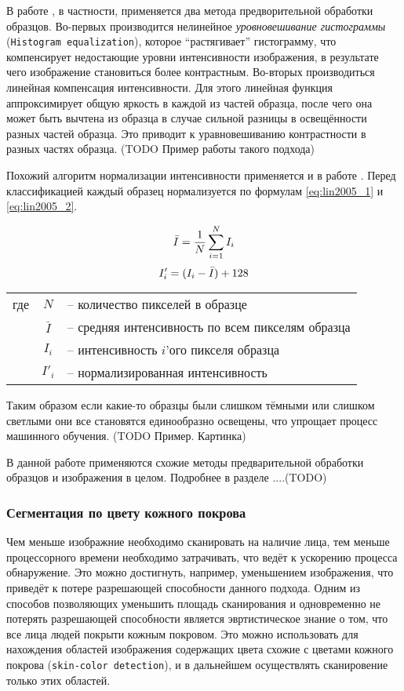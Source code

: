 \documentclass[12pt]{report}
\begin{document}
В работе \citep{rowley1998neural}, в частности, применяется два метода предворительной обработки образцов. Во-первых производится нелинейное \emph{уровновешивание гистограммы} (\texttt{Histogram equalization}), которое ``растягивает'' гистограмму, что компенсирует недостающие уровни интенсивности изображения, в результате чего изображение становиться более контрастным. Во-вторых производиться линейная компенсация интенсивности. Для этого линейная функция аппроксимирует общую яркость в каждой из частей образца, после чего она может быть вычтена из образца в случае сильной разницы в освещённости разных частей образца. Это приводит к уравновешиванию контрастности в разных частях образца. (TODO Пример работы такого подхода) 

Похожий алгоритм нормализации интенсивности применяется и в работе \citep{lin2005face}. Перед классификацией каждый образец нормализуется по формулам \ref{eq:lin2005_1} и \ref{eq:lin2005_2}.

\begin{equation}
\label{eq:lin2005_1}
\centering
\bar{I}=\frac{1}{N}\sum_{i=1}^{N}I_{i}
\end{equation}
\begin{equation}
\label{eq:lin2005_2}
\centering
{I}'_i=(I_i-\bar{I})+128
\end{equation}

\begin{tabular}{p{3cm} c l}
где & $N$ & -- количество пикселей в образце\\
	& $\bar{I}$ & -- средняя интенсивность по всем пикселям образца\\
	& $I_i$ & -- интенсивность $i$'ого пикселя образца\\
	& ${I}'_i$ & -- нормализированная интенсивность\\
\end{tabular}

Таким образом если какие-то образцы были слишком тёмными или слишком светлыми они все становятся единообразно освещены, что упрощает процесс машинного обучения. (TODO Пример. Картинка)

В данной работе применяются схожие методы предварительной обработки образцов и изображения в целом. Подробнее в разделе ....(TODO)

\subsubsection{Сегментация по цвету кожного покрова}
Чем меньше изображние необходимо сканировать на наличие лица, тем меньше процессорного времени необходимо затрачивать, что ведёт к ускорению процесса обнаружение. Это можно достигнуть, например, уменьшением изображения, что приведёт к потере разрешающей способности данного подхода. Одним из способов позволяющих уменьшить площадь сканирования и одновременно не потерять разрешающей способности является эвртистическое знание о том, что все лица людей покрыти кожным покровом. Это можно использовать для нахождения областей изображения содержащих цвета схожие с цветами кожного покрова (\texttt{skin-color detection}), и в дальнейшем осуществлять сканировение только этих областей.
\end{document}
